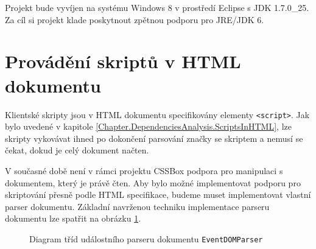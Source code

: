 Projekt bude vyvíjen na systému Windows 8 v prostředí Eclipse s JDK 1.7.0\_25. Za cíl si projekt klade poskytnout zpětnou podporu pro JRE/JDK 6.
 
\section{Provádění skriptů v HTML dokumentu}
\label{Chapter.Design.ScriptsInHTML}

Klientské skripty jsou v HTML dokumentu specifikovány elementy \texttt{<script>}. Jak bylo uvedené v kapitole \ref{Chapter.DependenciesAnalysis.ScriptsInHTML}, lze skripty vykovávat ihned po dokončení parsování značky se skriptem a nemusí se čekat, dokud je celý dokument načten. 

V současné době není v rámci projektu CSSBox podpora pro manipulaci s dokumentem, který je právě čten. Aby bylo možné implementovat podporu pro skriptování přesně podle HTML specifikace, budeme muset implementovat vlastní parser dokumentu. Základní navrženou techniku implementace parseru dokumentu lze spatřit na obrázku \ref{Figure.EventDOMParserDesign}.

\begin{figure}[H]
  \begin{center}
    \caption{Diagram tříd událostního parseru dokumentu \texttt{EventDOMParser}}
    \label{Figure.EventDOMParserDesign}
  \end{center}
\end{figure}

